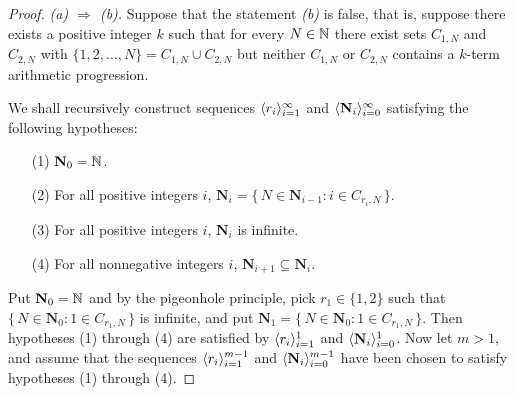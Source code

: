 \begin{proof}
  \textsl{(a) $\Rightarrow$ (b).}%
  Suppose that the statement \textsl{(b)} is false, that is, suppose there exists a positive integer $k$ such that for every $N \in \mathbb{N}$ there exist sets $C_{1,N}$ and $C_{2,N}$ with $\{1, 2, \ldots, N\} = C_{1, N} \cup C_{2, N}$ but neither $C_{1,N}$ or $C_{2,N}$ contains a $k$-term arithmetic progression. 

  We shall recursively construct sequences $\langle r_i \rangle_{i=1}^\infty$ and $\langle \mathbf{N}_i \rangle_{i=0}^\infty$ satisfying the following hypotheses:
  \begin{itemize}
    \item[(1)]
      $\mathbf{N}_0 = \mathbb{N}$.

    \item[(2)]
      For all positive integers $i$, $\mathbf{N}_i = \{\, N \in \mathbf{N}_{i-1} : i \in C_{r_i, N} \,\}$.

    \item[(3)]
      For all positive integers $i$, $\mathbf{N}_i$ is infinite.

    \item[(4)] 
      For all nonnegative integers $i$, $\mathbf{N}_{i+1} \subseteq \mathbf{N}_i$.
  \end{itemize}

  Put $\mathbf{N}_0 = \mathbb{N}$ and by the pigeonhole principle, pick $r_1 \in \{1, 2 \}$ such that $\{\, N \in \mathbf{N}_0 : 1 \in C_{r_1, N} \,\}$ is infinite, and put $\mathbf{N}_1 = \{\, N \in \mathbf{N}_0 : 1 \in C_{r_1, N} \,\}$.
  Then hypotheses (1) through (4) are satisfied by $\langle r_i \rangle_{i=1}^1$ and $\langle \mathbf{N}_i \rangle_{i=0}^1$.
  Now let $m > 1$, and assume that the sequences $\langle r_i \rangle_{i=1}^{m-1}$ and $\langle \mathbf{N}_i \rangle_{i=0}^{m-1}$ have been chosen to satisfy hypotheses (1) through (4).
  

\end{proof}
